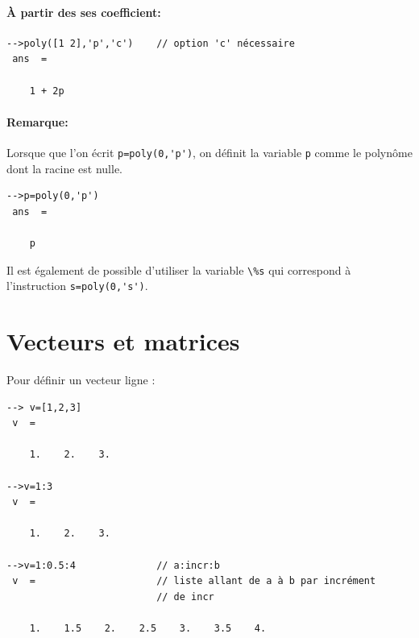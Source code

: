 \paragraph{\`A partir des ses coefficient:}

\begin{code}
\begin{verbatim}
-->poly([1 2],'p','c')    // option 'c' nécessaire
 ans  =
 
    1 + 2p
\end{verbatim}
\end{code}

\paragraph{Remarque:}
Lorsque que l'on écrit \verb?p=poly(0,'p')?, on définit la variable \verb?p? 
comme le polynôme dont la racine est nulle.
\begin{code}
\begin{verbatim}
-->p=poly(0,'p')
 ans  =

    p
\end{verbatim}
\end{code}

Il est également de possible d'utiliser la variable \verb?\%s? qui correspond
à l'instruction \verb?s=poly(0,'s')?.

\section{Vecteurs et matrices}


Pour définir un vecteur ligne :
\begin{code}
\begin{verbatim}
--> v=[1,2,3]
 v  =
 
    1.    2.    3. 

-->v=1:3
 v  =
 
    1.    2.    3.

-->v=1:0.5:4              // a:incr:b
 v  =                     // liste allant de a à b par incrément 
                          // de incr
 
    1.    1.5    2.    2.5    3.    3.5    4.
\end{verbatim}
\end{code}

